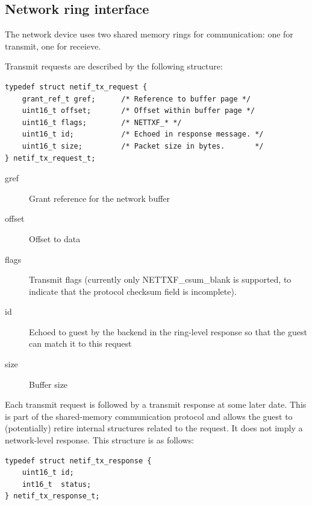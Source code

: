 \documentclass[11pt,twoside,final,openright]{report}
\begin{document}


\subsection{Network ring interface}

The network device uses two shared memory rings for communication: one
for transmit, one for receieve.

Transmit requests are described by the following structure:

\scriptsize
\begin{verbatim}
typedef struct netif_tx_request {
    grant_ref_t gref;      /* Reference to buffer page */
    uint16_t offset;       /* Offset within buffer page */
    uint16_t flags;        /* NETTXF_* */
    uint16_t id;           /* Echoed in response message. */
    uint16_t size;         /* Packet size in bytes.       */
} netif_tx_request_t;
\end{verbatim}
\normalsize

\begin{description}
\item[gref] Grant reference for the network buffer
\item[offset] Offset to data
\item[flags] Transmit flags (currently only NETTXF\_csum\_blank is
  supported, to indicate that the protocol checksum field is
  incomplete).
\item[id] Echoed to guest by the backend in the ring-level response so
  that the guest can match it to this request
\item[size] Buffer size
\end{description}

Each transmit request is followed by a transmit response at some later
date.  This is part of the shared-memory communication protocol and
allows the guest to (potentially) retire internal structures related
to the request.  It does not imply a network-level response.  This
structure is as follows:

\scriptsize
\begin{verbatim}
typedef struct netif_tx_response {
    uint16_t id;
    int16_t  status;
} netif_tx_response_t;
\end{verbatim}
\normalsize
\end{document}
